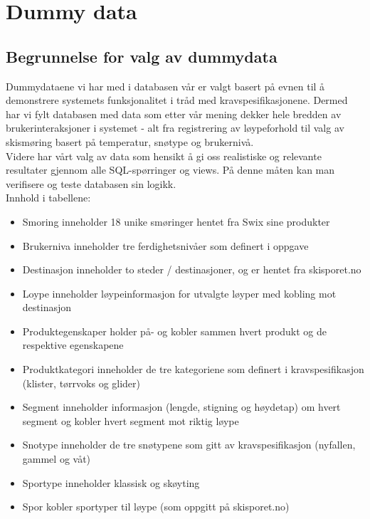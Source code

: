 \documentclass[10pt, a4paper]{article}
\begin{document}
\section{Dummy data}

\subsection{Begrunnelse for valg av dummydata}

Dummydataene vi har med i databasen vår er valgt basert på evnen til å demonstrere systemets funksjonalitet i tråd med kravspesifikasjonene. Dermed har vi fylt databasen med data som etter vår mening dekker hele bredden av brukerinteraksjoner i systemet - alt fra registrering av løypeforhold til valg av skismøring basert på temperatur, snøtype og brukernivå. \\

Videre har vårt valg av data som hensikt å gi oss realistiske og relevante resultater gjennom alle SQL-spørringer og views. På denne måten kan man verifisere og teste databasen sin logikk. \\

Innhold i tabellene:
\begin{itemize}
	\item Smoring inneholder 18 unike smøringer hentet fra Swix sine produkter
	\item Brukerniva inneholder tre ferdighetsnivåer som definert i oppgave
	\item Destinasjon inneholder to steder / destinasjoner, og er hentet fra skisporet.no
	\item Loype inneholder løypeinformasjon for utvalgte løyper med kobling mot destinasjon 
	\item Produktegenskaper holder på- og kobler sammen hvert produkt og de respektive egenskapene 
	\item Produktkategori inneholder de tre kategoriene som definert i kravspesifikasjon (klister, tørrvoks og glider)
	\item Segment inneholder informasjon (lengde, stigning og høydetap) om hvert segment og kobler hvert segment mot riktig løype 
	\item Snotype inneholder de tre snøtypene som gitt av kravspesifikasjon (nyfallen, gammel og våt) 
	\item Sportype inneholder klassisk og skøyting 
	\item Spor kobler sportyper til løype (som oppgitt på skisporet.no)
\end{itemize}
\end{document}
